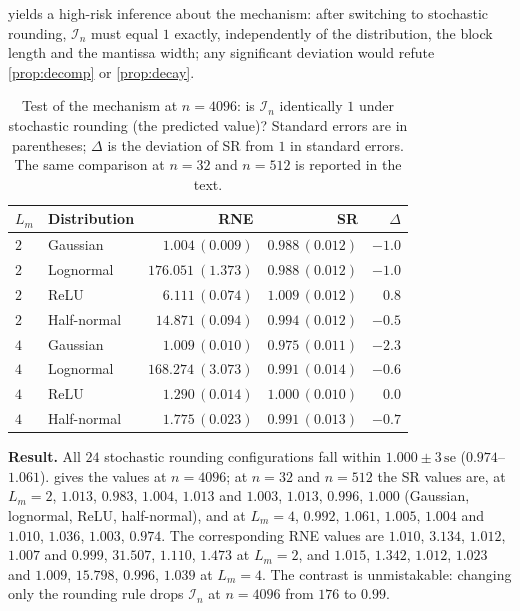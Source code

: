 \documentclass[review,hidelinks,oneeqnum,onetabnum,onefignum,onethmnum]{siamart251216}
\begin{document}
 yields a high-risk inference about the mechanism: after switching
to stochastic rounding, $\mathcal I_n$ must equal $1$ exactly, independently of
the distribution, the block length and the mantissa width; any significant
deviation would refute \cref{prop:decomp} or \cref{prop:decay}.

\begin{table}[!tb]
\centering
\caption{Test of the mechanism at $n=4096$: is $\mathcal I_n$ identically $1$
under stochastic rounding (the predicted value)? Standard errors are in
parentheses; $\Delta$ is the deviation of SR from $1$ in standard errors. The
same comparison at $n=32$ and $n=512$ is reported in the text.}
\label{tab:srfull}
\setlength{\tabcolsep}{4pt}
\footnotesize
\begin{tabular}{@{}llrrr@{}}
\toprule
$L_m$ & Distribution & RNE & SR & $\Delta$ \\
\midrule
$2$ & Gaussian    & $1.004\,(0.009)$ & $0.988\,(0.012)$ & $-1.0$ \\
$2$ & Lognormal   & $\mathbf{176.051}\ (1.373)$ & $\mathbf{0.988}\,(0.012)$ & $-1.0$ \\
$2$ & ReLU        & $\mathbf{6.111}\,(0.074)$ & $\mathbf{1.009}\,(0.012)$ & $0.8$ \\
$2$ & Half-normal & $\mathbf{14.871}\,(0.094)$ & $\mathbf{0.994}\,(0.012)$ & $-0.5$ \\
\midrule
$4$ & Gaussian    & $1.009\,(0.010)$ & $0.975\,(0.011)$ & $-2.3$ \\
$4$ & Lognormal   & $\mathbf{168.274}\ (3.073)$ & $\mathbf{0.991}\,(0.014)$ & $-0.6$ \\
$4$ & ReLU        & $1.290\,(0.014)$ & $1.000\,(0.010)$ & $0.0$ \\
$4$ & Half-normal & $1.775\,(0.023)$ & $0.991\,(0.013)$ & $-0.7$ \\
\bottomrule
\end{tabular}
\end{table}

\noindent\textbf{Result.} All $24$ stochastic rounding configurations fall within
$1.000\pm3\,\mathrm{se}$ ($0.974$--$1.061$).  gives the values at
$n=4096$; at $n=32$ and $n=512$ the SR values are, at $L_m=2$, $1.013$, $0.983$,
$1.004$, $1.013$ and $1.003$, $1.013$, $0.996$, $1.000$ (Gaussian, lognormal,
ReLU, half-normal), and at $L_m=4$, $0.992$, $1.061$, $1.005$, $1.004$ and
$1.010$, $1.036$, $1.003$, $0.974$. The corresponding RNE values are $1.010$,
$3.134$, $1.012$, $1.007$ and $0.999$, $31.507$, $1.110$, $1.473$ at $L_m=2$,
and $1.015$, $1.342$, $1.012$, $1.023$ and $1.009$, $15.798$, $0.996$, $1.039$ at
$L_m=4$. The contrast is unmistakable: changing only the rounding rule drops
$\mathcal I_n$ at $n=4096$ from $176$ to $0.99$.
\end{document}
